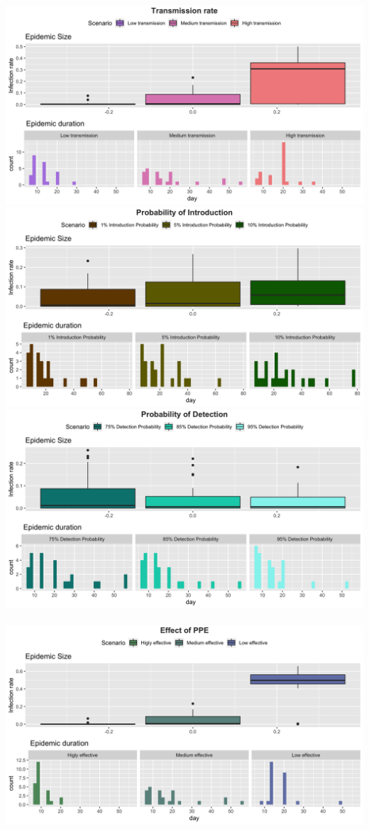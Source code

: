 \documentclass[
]{article}
\begin{document}
\includegraphics{Figures/SensitivityAnalysis/Transmission}\\
\includegraphics{Figures/SensitivityAnalysis/Introduction}\\
\includegraphics{Figures/SensitivityAnalysis/ProbDetection}\\
~\\
\includegraphics{Figures/SensitivityAnalysis/PPE}
\end{document}
